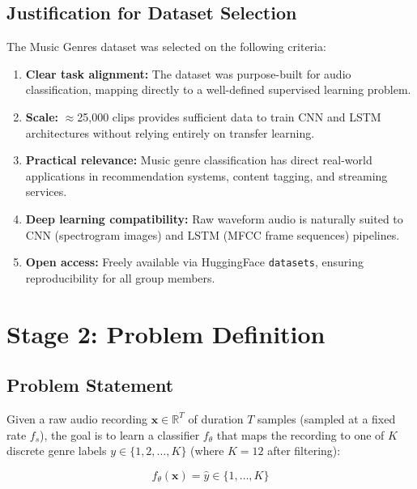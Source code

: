 \documentclass[12pt, a4paper]{article}
\begin{document}
\subsection{Justification for Dataset Selection}

The Music Genres dataset was selected on the following criteria:

\begin{enumerate}[noitemsep, topsep=2pt]
    \item \textbf{Clear task alignment:} The dataset was purpose-built for audio
          classification, mapping directly to a well-defined supervised learning problem.
    \item \textbf{Scale:} $\approx$25{,}000 clips provides sufficient data to train
          CNN and LSTM architectures without relying entirely on transfer learning.
    \item \textbf{Practical relevance:} Music genre classification has direct real-world
          applications in recommendation systems, content tagging, and streaming services.
    \item \textbf{Deep learning compatibility:} Raw waveform audio is naturally suited to
          CNN (spectrogram images) and LSTM (MFCC frame sequences) pipelines.
    \item \textbf{Open access:} Freely available via HuggingFace \texttt{datasets},
          ensuring reproducibility for all group members.
\end{enumerate}

\section{Stage 2: Problem Definition}
\label{sec:problem}

\subsection{Problem Statement}

Given a raw audio recording $\mathbf{x} \in \mathbb{R}^{T}$ of duration $T$ samples
(sampled at a fixed rate $f_s$), the goal is to learn a classifier $f_\theta$ that
maps the recording to one of $K$ discrete genre labels $y \in \{1, 2, \ldots, K\}$
(where $K = 12$ after filtering):

\begin{equation}
    f_\theta(\mathbf{x}) = \hat{y} \in \{1, \ldots, K\}
    \label{eq:classifier}
\end{equation}
\end{document}
